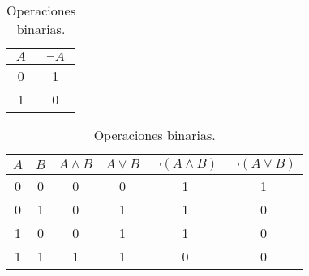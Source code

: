 \begin{table}
    \caption{Operaciones binarias.}
    \label{table:binaryops}
    \centering
     \begin{tabular}{c|c}
     	\toprule
     	$A$ & $\neg A$ \\
     	\midrule
     	0 & 1 \\
     	1 & 0 \\
     	\bottomrule
     \end{tabular}
     \hspace*{1 cm}   
     \begin{tabular}{c|c|c|c|c|c}
     	\toprule
     	$A$ & $B$ & $A \land B$ & $A \lor B$ & $\neg (A \land B)$ & $\neg (A \lor B)$ \\
     	\midrule
     	0 & 0 & 0 & 0 & 1 & 1 \\
     	0 & 1 & 0 & 1 & 1 & 0 \\
     	1 & 0 & 0 & 1 & 1 & 0 \\
     	1 & 1 & 1 & 1 & 0 & 0 \\
     	\bottomrule
     \end{tabular}
\end{table}
